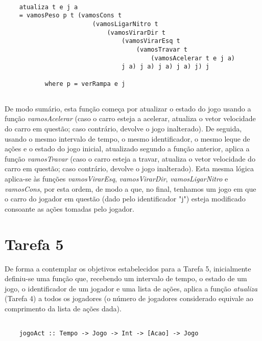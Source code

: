 \documentclass[a4paper]{report} %
\begin{document}
  \begin{verbatim}
      
    atualiza t e j a 
    = vamosPeso p t (vamosCons t 
                        (vamosLigarNitro t 
                            (vamosVirarDir t 
                                (vamosVirarEsq t 
                                    (vamosTravar t 
                                        (vamosAcelerar t e j a) 
                                j a) j a) j a) j a) j) j 
         
           where p = verRampa e j
      
  \end{verbatim}
  
  \newpage
  
  \par \noindent De modo sumário, esta função começa por atualizar o estado do jogo usando a função \textit{vamosAcelerar} (caso o carro esteja a acelerar, atualiza o vetor velocidade do carro em questão; caso contrário, devolve o jogo inalterado). De seguida, usando o mesmo intervalo de tempo, o mesmo identificador, o mesmo leque de ações e o estado do jogo inicial, atualizado segundo a função anterior, aplica a função \textit{vamosTravar} (caso o carro esteja a travar, atualiza o vetor velocidade do carro em questão; caso contrário, devolve o jogo inalterado). Esta mesma lógica aplica-se às funções \textit{vamosVirarEsq}, \textit{vamosVirarDir}, \textit{vamosLigarNitro} e \textit{vamosCons}, por esta ordem, de modo a que, no final, tenhamos um jogo em que o carro do jogador em questão (dado pelo identificador "j") esteja modificado consoante as ações tomadas pelo jogador.
  
  \newpage
  
  \section{Tarefa 5}
  
  \par \noindent De forma a contemplar os objetivos estabelecidos para a Tarefa 5, inicialmente definiu-se uma função que, recebendo um intervalo de tempo, o estado de um jogo, o identificador de um jogador e uma lista de ações, aplica a função \textit{atualiza} (Tarefa 4) a todos os jogadores (o número de jogadores considerado equivale ao comprimento da lista de ações dada).
  
  \begin{verbatim}
      
    jogoAct :: Tempo -> Jogo -> Int -> [Acao] -> Jogo  
      
  \end{verbatim}
  
\end{document}
